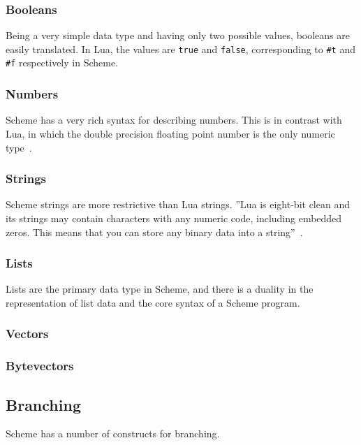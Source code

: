 \subsubsection{Booleans}

Being a very simple data type and having only two possible values, booleans are
easily translated. In Lua, the values are \texttt{true} and \texttt{false},
corresponding to \texttt{\#t} and \texttt{\#f} respectively in Scheme.

\subsubsection{Numbers}

Scheme has a very rich syntax for describing numbers. This is in contrast with
Lua, in which the double precision floating point number is the only
numeric type~\cite[p.10]{luabook}.

\subsubsection{Strings}

Scheme strings are more restrictive than Lua strings. ''Lua is
eight-bit clean and its strings may contain characters with any numeric code,
including embedded zeros. This means that you can store any binary data into a
string''~\cite[p.11]{luabook}.

\subsubsection{Lists}

Lists are the primary data type in Scheme, and there is a duality in the
representation of list data and the core syntax of a Scheme program.

\subsubsection{Vectors}

\subsubsection{Bytevectors}

\subsection{Branching}

Scheme has a number of constructs for branching.

